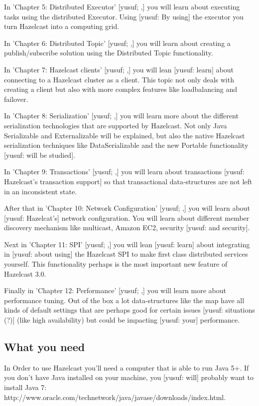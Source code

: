 In 'Chapter 5: Distributed Executor' [yusuf; ,] you will learn about executing tasks using the distributed Executor. Using [yusuf: By using] the executor you turn Hazelcast into a computing grid. 

In 'Chapter 6: Distributed Topic' [yusuf; ,] you will learn about creating a publish/subscribe solution using the Distributed Topic functionality.

In 'Chapter 7: Hazelcast clients' [yusuf; ,] you will lean [yusuf: learn] about connecting to a Hazelcast cluster as a client. This topic not only deals with creating a client but also with more complex features like loadbalancing and failover.

In 'Chapter 8: Serialization' [yusuf; ,] you will learn more about the different serialization technologies that are supported by Hazelcast. Not only Java Serializable and Externalizable will be explained, but also the native Hazelcast serialization techniques like DataSerializable and the new Portable functionality [yusuf: will be studied].

In 'Chapter 9: Transactions' [yusuf; ,] you will learn about transactions [yusuf: Hazelcast's transaction support] so that transactional data-structures are not left in an inconsistent state.

After that in 'Chapter 10: Network Configuration' [yusuf; ,] you will learn about [yusuf: Hazelcat's] network configuration. You will learn about different member discovery mechanism like multicast, Amazon EC2, security [yusuf: and security]. 

Next in 'Chapter 11: SPI' [yusuf; ,] you will lean [yusuf: learn] about integrating in [yusuf: about using] the Hazelcast SPI to make first class distributed services yourself. This functionality perhaps is the most important new feature of Hazelcast 3.0.

Finally in 'Chapter 12: Performance' [yusuf; ,]  you will learn more about performance tuning.  Out of the box a lot data-structures like the map have all kinds of default settings that are perhaps good for certain issues [yusuf: situations (?)] (like high availability) but could be impacting [yusuf: your] performance. 

\subsection*{What you need}
In Order to use Hazelcast you'll need a computer that is able to run Java 5+. If you don't have Java installed on your machine, you [yusuf: will] probably want to install Java 7: 
http://www.oracle.com/technetwork/java/javase/downloads/index.html. 

